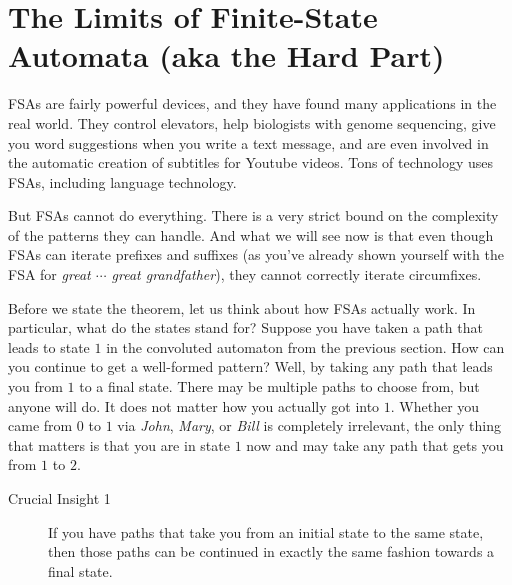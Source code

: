 \section{The Limits of Finite-State Automata (aka the Hard Part)}

FSAs are fairly powerful devices, and they have found many applications in the real world.
They control elevators, help biologists with genome sequencing, give you word suggestions when you write a text message, and are even involved in the automatic creation of subtitles for Youtube videos.
Tons of technology uses FSAs, including language technology.

But FSAs cannot do everything.
There is a very strict bound on the complexity of the patterns they can handle.
And what we will see now is that even though FSAs can iterate prefixes and suffixes (as you've already shown yourself with the FSA for \emph{great $\cdots$ great grandfather}), they cannot correctly iterate circumfixes.

Before we state the theorem, let us think about how FSAs actually work.
In particular, what do the states stand for?
Suppose you have taken a path that leads to state $1$ in the convoluted automaton from the previous section.
How can you continue to get a well-formed pattern?
Well, by taking any path that leads you from $1$ to a final state.
There may be multiple paths to choose from, but anyone will do.
It does not matter how you actually got into $1$.
Whether you came from $0$ to $1$ via \emph{John}, \emph{Mary}, or \emph{Bill} is completely irrelevant, the only thing that matters is that you are in state $1$ now and may take any path that gets you from $1$ to $2$.
%
\begin{description}
    \item[Crucial Insight 1]
        If you have paths that take you from an initial state to the same state, then those paths can be continued in exactly the same fashion towards a final state.
\end{description}

